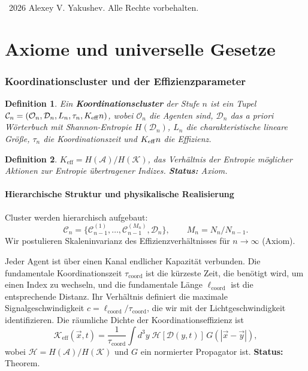 \documentclass[11pt,a4paper]{article}
\newtheorem{definition}{Definition}[section]
\newcommand{\Keff}[1][]{K_{\mathrm{eff}\if\relax\detokenize{#1}\relax\else,#1\fi}}
\newcommand{\coord}{\mathrm{coord}}
\newcommand{\Dir}{\mathcal{D}}
\newcommand{\cC}{\mathcal{C}}
\begin{document}
\begin{titlepage}
		\vspace{0.5cm}
		\textcopyright\ 2026 Alexey V. Yakushev. Alle Rechte vorbehalten.
	\end{titlepage}
	
	\tableofcontents
	\newpage
	
	\part{Axiome und universelle Gesetze}
	
	\section{Koordinationscluster und der Effizienzparameter}
	\begin{definition}
		Ein \textbf{Koordinationscluster} der Stufe \(n\) ist ein Tupel \(\cC_n = (\mathcal{O}_n, \Dir_n, L_n, \tau_n, \Keff{n})\), wobei \(\mathcal{O}_n\) die Agenten sind, \(\Dir_n\) das a priori Wörterbuch mit Shannon-Entropie \(H(\Dir_n)\), \(L_n\) die charakteristische lineare Größe, \(\tau_n\) die Koordinationszeit und \(\Keff{n}\) die Effizienz.
	\end{definition}
	
	\begin{definition}
		\(K_{\mathrm{eff}} = H(\mathcal{A})/H(\mathcal{K})\), das Verhältnis der Entropie möglicher Aktionen zur Entropie übertragener Indizes. \textbf{Status:} Axiom.
	\end{definition}
	
	\subsection{Hierarchische Struktur und physikalische Realisierung}
	Cluster werden hierarchisch aufgebaut:
	\[
	\cC_n = \{\cC_{n-1}^{(1)},\dots,\cC_{n-1}^{(M_n)},\Dir_n\}, \qquad M_n = N_n/N_{n-1}.
	\]
	Wir postulieren Skaleninvarianz des Effizienzverhältnisses für \(n\to\infty\) (Axiom).
	
	Jeder Agent ist über einen Kanal endlicher Kapazität verbunden. Die fundamentale Koordinationszeit \(\tau_{\coord}\) ist die kürzeste Zeit, die benötigt wird, um einen Index zu wechseln, und die fundamentale Länge \(\ell_{\coord}\) ist die entsprechende Distanz. Ihr Verhältnis definiert die maximale Signalgeschwindigkeit \(c = \ell_{\coord}/\tau_{\coord}\), die wir mit der Lichtgeschwindigkeit identifizieren. Die räumliche Dichte der Koordinationseffizienz ist
	\begin{equation}
		\mathcal{K}_{\mathrm{eff}}(\vec{x},t) = \frac{1}{\tau_{\coord}} \int d^3y\; \mathcal{H}[\Dir(y,t)]\, G(|\vec{x}-\vec{y}|),
		\label{eq:Kfield}
	\end{equation}
	wobei \(\mathcal{H} = H(\mathcal{A})/H(\mathcal{K})\) und \(G\) ein normierter Propagator ist. \textbf{Status:} Theorem.
	
\end{document}
